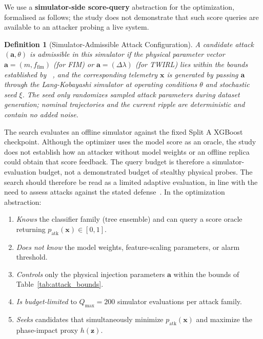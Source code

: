 \documentclass[journal,twocolumn]{IEEEtran}
\newtheorem{definition}{Definition}
\newcommand{\vx}{\mathbf{x}}
\newcommand{\va}{\mathbf{a}}
\newcommand{\vz}{\mathbf{z}}
\newcommand{\patk}{p_{\mathrm{atk}}}
\newcommand{\hobs}{h(\vz)}
\begin{document}
We use a \textbf{simulator-side score-query} abstraction for the optimization,
formalised as follows; the study does not demonstrate that such score queries are
available to an attacker probing a live system.

\begin{definition}[Simulator-Admissible Attack Configuration]
A candidate attack $(\va, \theta)$ is \emph{admissible in this simulator} if the
physical parameter vector $\va = (m, f_\mathrm{fim})$ (for FIM) or
$\va = (\Delta\lambda)$ (for TWIRL) lies within the bounds established by
~\cite{juarez2026}, and the corresponding telemetry $\vx$ is generated by passing
$\va$ through the Lang-Kobayashi simulator at operating conditions $\theta$ and
stochastic seed $\xi$. The seed only randomizes sampled attack parameters during
dataset generation; nominal trajectories and the current ripple are deterministic
and contain no added noise.
\end{definition}

The search evaluates an offline simulator against the fixed Split A XGBoost
checkpoint. Although the optimizer uses the model score as an oracle, the study does
not establish how an attacker without model weights or an offline replica could
obtain that score feedback. The query budget is therefore a simulator-evaluation
budget, not a demonstrated budget of stealthy physical probes. The search should
therefore be read as a limited adaptive evaluation, in line with the need to assess
attacks against the stated defense~\cite{tramer2020}. In the optimization abstraction:
\begin{enumerate}
  \item \textit{Knows} the classifier family (tree ensemble) and can query a
    score oracle returning $\patk(\vx) \in [0,1]$.
  \item \textit{Does not know} the model weights, feature-scaling parameters,
    or alarm threshold.
  \item \textit{Controls} only the physical injection parameters $\va$ within
    the bounds of Table~\ref{tab:attack_bounds}.
  \item \textit{Is budget-limited} to $Q_\mathrm{max}=200$ simulator evaluations
    per attack family.
  \item \textit{Seeks} candidates that simultaneously minimize $\patk(\vx)$ and
    maximize the phase-impact proxy $\hobs$.
\end{enumerate}
\end{document}
